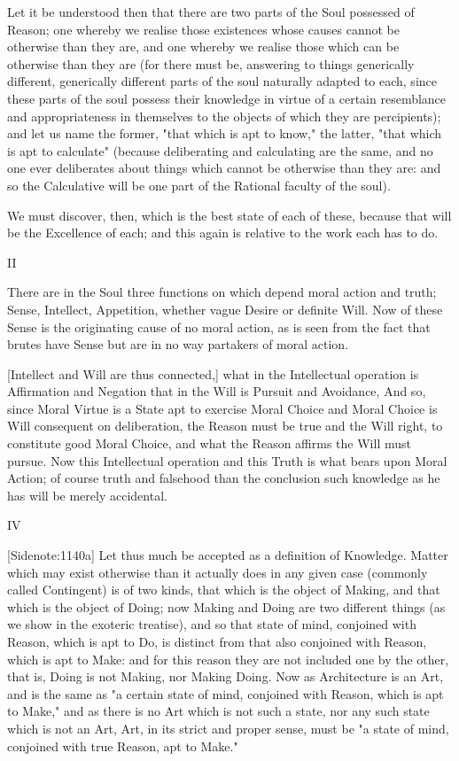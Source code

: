 Let it be understood then that there are two parts of the Soul possessed
of Reason; one whereby we realise those existences whose causes cannot
be otherwise than they are, and one whereby we realise those which can
be otherwise than they are (for there must be, answering to things
generically different, generically different parts of the soul naturally
adapted to each, since these parts of the soul possess their knowledge
in virtue of a certain resemblance and appropriateness in themselves to
the objects of which they are percipients); and let us name the
former, "that which is apt to know," the latter, "that which is apt to
calculate" (because deliberating and calculating are the same, and no
one ever deliberates about things which cannot be otherwise than they
are: and so the Calculative will be one part of the Rational faculty of
the soul).

We must discover, then, which is the best state of each of these,
because that will be the Excellence of each; and this again is relative
to the work each has to do.

II

There are in the Soul three functions on which depend moral action and
truth; Sense, Intellect, Appetition, whether vague Desire or definite
Will. Now of these Sense is the originating cause of no moral action, as
is seen from the fact that brutes have Sense but are in no way partakers
of moral action.

[Intellect and Will are thus connected,] what in the Intellectual
operation is Affirmation and Negation that in the Will is Pursuit and
Avoidance, And so, since Moral Virtue is a State apt to exercise Moral
Choice and Moral Choice is Will consequent on deliberation, the Reason
must be true and the Will right, to constitute good Moral Choice, and
what the Reason affirms the Will must pursue. Now this Intellectual
operation and this Truth is what bears upon Moral Action; of course
truth and falsehood than the conclusion such knowledge as he has will be
merely accidental.

IV

[Sidenote:1140a] Let thus much be accepted as a definition of Knowledge.
Matter which may exist otherwise than it actually does in any given case
(commonly called Contingent) is of two kinds, that which is the object
of Making, and that which is the object of Doing; now Making and Doing
are two different things (as we show in the exoteric treatise), and
so that state of mind, conjoined with Reason, which is apt to Do, is
distinct from that also conjoined with Reason, which is apt to Make: and
for this reason they are not included one by the other, that is, Doing
is not Making, nor Making Doing. Now as Architecture is an Art, and is
the same as "a certain state of mind, conjoined with Reason, which is
apt to Make," and as there is no Art which is not such a state, nor any
such state which is not an Art, Art, in its strict and proper sense,
must be "a state of mind, conjoined with true Reason, apt to Make."

